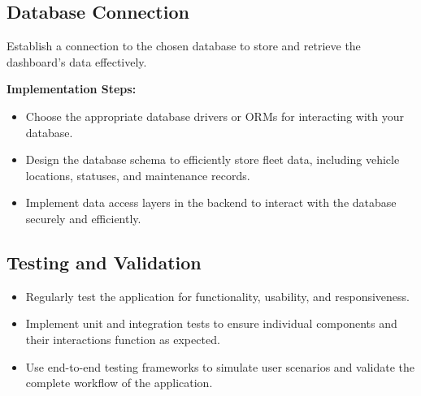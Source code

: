 \subsection*{Database Connection}
Establish a connection to the chosen database to store and retrieve the dashboard's data effectively.

\textbf{Implementation Steps:}
\begin{itemize}
    \item Choose the appropriate database drivers or ORMs for interacting with your database.
    \item Design the database schema to efficiently store fleet data, including vehicle locations, statuses, and maintenance records.
    \item Implement data access layers in the backend to interact with the database securely and efficiently.
\end{itemize}

\subsection*{Testing and Validation}
\begin{itemize}
    \item Regularly test the application for functionality, usability, and responsiveness.
    \item Implement unit and integration tests to ensure individual components and their interactions function as expected.
    \item Use end-to-end testing frameworks to simulate user scenarios and validate the complete workflow of the application.
\end{itemize}
